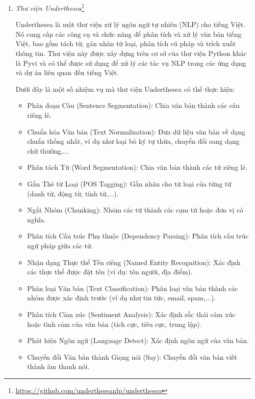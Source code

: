 \begin{enumerate}
    \item \textit{Thư viện Underthesea}\footnote{\url{https://github.com/undertheseanlp/underthesea}}

          Underthesea là một thư viện xử lý ngôn ngữ tự nhiên (NLP) cho tiếng Việt. Nó cung cấp các công cụ và chức năng để phân tích và xử lý văn bản tiếng Việt, bao gồm tách từ, gán nhãn từ loại, phân tích cú pháp và trích xuất thông tin. Thư viện này được xây dựng trên cơ sở của thư viện Python khác là Pyvi và có thể được sử dụng để xử lý các tác vụ NLP trong các ứng dụng và dự án liên quan đến tiếng Việt.

          Dưới đây là một số nhiệm vụ mà thư viện Underthesea có thể thực hiện:
          \begin{itemize}
              \item Phân đoạn Câu (Sentence Segmentation): Chia văn bản thành các câu riêng lẻ.
              \item Chuẩn hóa Văn bản (Text Normalization): Đưa dữ liệu văn bản về dạng chuẩn thống nhất, ví dụ như loại bỏ ký tự thừa, chuyển đổi sang dạng chữ thường,...
              \item Phân tách Từ (Word Segmentation): Chia văn bản thành các từ riêng lẻ.
              \item Gắn Thẻ từ Loại (POS Tagging): Gắn nhãn cho từ loại của từng từ (danh từ, động từ, tính từ,...).
              \item Ngắt Nhóm (Chunking): Nhóm các từ thành các cụm từ hoặc đơn vị có nghĩa.
              \item Phân tích Cấu trúc Phụ thuộc (Dependency Parsing): Phân tích cấu trúc ngữ pháp giữa các từ.
              \item Nhận dạng Thực thể Tên riêng (Named Entity Recognition): Xác định các thực thể được đặt tên (ví dụ: tên người, địa điểm).
              \item Phân loại Văn bản (Text Classification): Phân loại văn bản thành các nhóm được xác định trước (ví dụ như tin tức, email, spam,...).
              \item Phân tích Cảm xúc (Sentiment Analysis): Xác định sắc thái cảm xúc hoặc tình cảm của văn bản (tích cực, tiêu cực, trung lập).
              \item Phát hiện Ngôn ngữ (Language Detect): Xác định ngôn ngữ của văn bản.
              \item Chuyển đổi Văn bản thành Giọng nói (Say): Chuyển đổi văn bản viết thành âm thanh nói.
          \end{itemize}



\end{enumerate}

